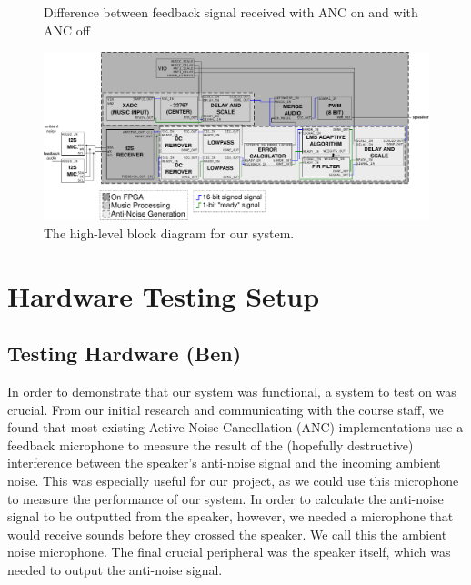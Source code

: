 \documentclass{fpgairpods}
\begin{document}
\begin{figure}
    \centering
    \caption{Difference between feedback signal received with ANC on and with ANC off}
    \label{chart:anc_freq_response}
\end{figure}

\begin{figure}
\includegraphics[width=\textheight]{./figs/block_diagram.pdf}
\caption{The high-level block diagram for our system.}
\label{fig:blockdiagram}
\end{figure}

\newpage
\section{Hardware Testing Setup}
\subsection{Testing Hardware (Ben)}
In order to demonstrate that our system was functional, a system to test on was crucial. From our initial research and communicating with the course staff, we found that most existing Active Noise Cancellation (ANC) implementations use a feedback microphone to measure the result of the (hopefully destructive) interference between the speaker's anti-noise signal and the incoming ambient noise. This was especially useful for our project, as we could use this microphone to measure the performance of our system. In order to calculate the anti-noise signal to be outputted from the speaker, however, we needed a microphone that would receive sounds before they crossed the speaker. We call this the ambient noise microphone. The final crucial peripheral was the speaker itself, which was needed to output the anti-noise signal. 
\end{document}
